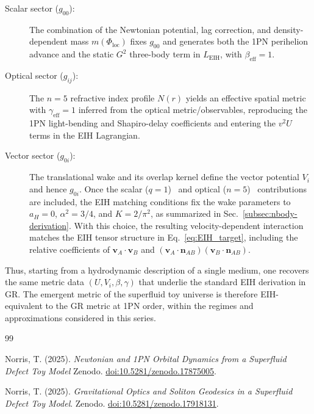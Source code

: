 \documentclass[11pt]{article}
\begin{document}
\begin{description}
  \item[Scalar sector ($g_{00}$):]
    The combination of the Newtonian potential, lag correction, and
    density-dependent mass $m(\Phi_{\text{loc}})$ fixes $g_{00}$ and
    generates both the 1PN perihelion advance and the static $G^2$
    three-body term in $L_{\text{EIH}}$, with $\beta_{\text{eff}}=1$.

  \item[Optical sector ($g_{ij}$):]
    The $n=5$ refractive index profile $N(r)$ yields an effective
    spatial metric with $\gamma_{\text{eff}}=1$ inferred from the optical
    metric/observables, reproducing the 1PN light-bending and
    Shapiro-delay coefficients and entering the $v^2 U$ terms in the
    EIH Lagrangian.

  \item[Vector sector ($g_{0i}$):]
    The translational wake and its overlap kernel define the vector potential
    $V_i$ and hence $g_{0i}$. Once the scalar ($q=1$)~\cite{Norris:2025Orbits} and optical
    ($n=5$)~\cite{Norris:Paper2} contributions are included, the EIH matching conditions
    fix the wake parameters to $a_H=0$, $\alpha^2=3/4$, and $K=2/\pi^2$, as
    summarized in Sec.~\ref{subsec:nbody-derivation}. With this choice, the
    resulting velocity-dependent interaction matches the EIH tensor structure
    in Eq.~\eqref{eq:EIH_target}, including the relative coefficients of
    $\mathbf{v}_A\cdot\mathbf{v}_B$ and
    $(\mathbf{v}_A\cdot\mathbf{n}_{AB})(\mathbf{v}_B\cdot\mathbf{n}_{AB})$.
\end{description}

Thus, starting from a hydrodynamic description of a single medium,
one recovers the same metric data $(U,V_i,\beta,\gamma)$ that
underlie the standard EIH derivation in GR.
The emergent metric of the superfluid toy universe is therefore
EIH-equivalent to the GR metric at 1PN order, within the regimes and
approximations considered in this series.

\begin{thebibliography}{99}

Norris, T. (2025).
\newblock \emph{Newtonian and 1PN Orbital Dynamics from a Superfluid Defect Toy Model}
\newblock Zenodo.
\newblock \href{https://doi.org/10.5281/zenodo.17875005}{doi:10.5281/zenodo.17875005}.

Norris, T. (2025).
\newblock \emph{Gravitational Optics and Soliton Geodesics in a Superfluid Defect Toy Model}.
\newblock Zenodo.
\newblock \href{https://doi.org/10.5281/zenodo.17918131}{doi:10.5281/zenodo.17918131}.

\end{thebibliography}
\end{document}
